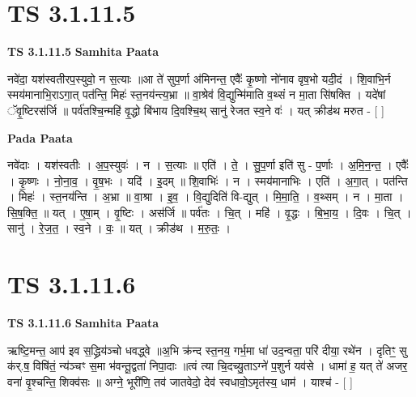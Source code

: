 \documentclass[17pt]{extarticle}
\begin{document}

\section{ TS 3.1.11.5 }

\textbf{TS 3.1.11.5 } \newline
\textbf{Samhita Paata} \newline

नवे॑दा॒ यश॑स्वतीरप॒स्युवो॒ न स॒त्याः ॥आ ते॑ सुप॒र्णा अ॑मिनन्त॒ एवैः᳚ कृ॒ष्णो नो॑नाव वृष॒भो यदी॒दं । शि॒वाभि॒र्न स्मय॑मानाभि॒राऽगा॒त् पत॑न्ति॒ मिहः॑ स्त॒नय॑न्त्य॒भ्रा ॥ वा॒श्रेव॑ वि॒द्युन्मि॑माति व॒थ्सं न मा॒ता सि॑षक्ति । यदे॑षां ॅवृ॒ष्टिरस॑र्जि ॥ पर्व॑तश्चि॒न्महि॑ वृ॒द्धो बि॑भाय दि॒वश्चि॒थ् सानु॑ रेजत स्व॒ने वः॑ । यत् क्रीड॑थ मरुत - [  ] \newline

\textbf{Pada Paata} \newline

नवे॑दाः । यश॑स्वतीः । अ॒प॒स्युवः॑ । न । स॒त्याः ॥ एति॑ । ते॒ । सु॒प॒र्णा इति॑ सु - प॒र्णाः । अ॒मि॒न॒न्त॒ । एवैः᳚ । कृ॒ष्णः । नो॒ना॒व॒ । वृ॒ष॒भः । यदि॑ । इ॒दम् ॥ शि॒वाभिः॑ । न । स्मय॑मानाभिः । एति॑ । अ॒गा॒त् । पत॑न्ति । मिहः॑ । स्त॒नय॑न्ति । अ॒भ्रा ॥ वा॒श्रा । इ॒व॒ । वि॒द्युदिति॑ वि-द्युत् । मि॒मा॒ति॒ । व॒थ्सम् । न । मा॒ता । सि॒ष॒क्ति॒ ॥ यत् । ए॒षा॒म् । वृ॒ष्टिः । अस॑र्जि ॥ पर्व॑तः । चि॒त् । महि॑ । वृ॒द्धः । बि॒भा॒य॒ । दि॒वः । चि॒त् । सानु॑ । रे॒ज॒त॒ । स्व॒ने । वः॒ ॥ यत् । क्रीड॑थ । म॒रु॒तः॒ ।  \newline





\section{ TS 3.1.11.6 }

\textbf{TS 3.1.11.6 } \newline
\textbf{Samhita Paata} \newline

ऋष्टि॒मन्त॒ आप॑ इव स॒द्ध्रिय॑ञ्चो धवद्ध्वे ॥अ॒भि क्र॑न्द स्त॒नय॒ गर्भ॒मा धा॑ उद॒न्वता॒ परि॑ दीया॒ रथे॑न । दृतिꣳ॒॒ सु क॑र्.ष॒ विषि॑तं॒ न्य॑ञ्चꣳ स॒मा भ॑वन्तू॒द्वता॑ निपा॒दाः ॥त्वं त्या चि॒दच्यु॒ताऽग्ने॑ प॒शुर्न यव॑से । धामा॑ ह॒ यत् ते॑ अजर॒ वना॑ वृ॒श्चन्ति॒ शिक्व॑सः ॥ अग्ने॒ भूरी॑णि॒ तव॑ जातवेदो॒ देव॑ स्वधावो॒ऽमृत॑स्य॒ धाम॑ । याश्च॑ - [  ] \newline
\end{document}

